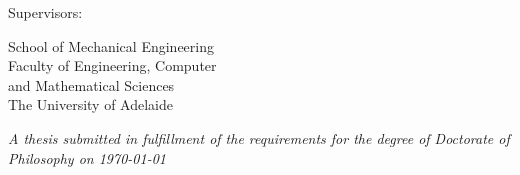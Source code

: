 
\begin{titlepage}

  \thispagestyle{empty}\noindent
  \vfill

  \begin{center}
  \huge{\thetitle}%
  \vfill\noindent
  \Large{\theauthor}
  \vfill

  \small{Supervisors:\\\supervisors}
  \end{center}

  \vfill

  \small{
  School of Mechanical Engineering\\
  Faculty of Engineering, Computer\\ and Mathematical Sciences\\
  The University of Adelaide
  }

  \vfill

  \center
  \emph{A thesis submitted in fulfillment of the requirements for the degree of Doctorate of Philosophy on \mydate\today}

\end{titlepage}

